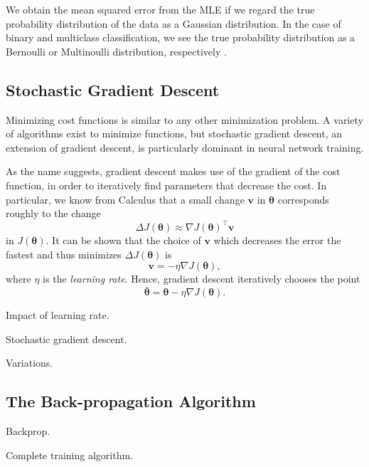 We obtain the mean squared error from the MLE if we regard the true probability distribution of the data as a Gaussian distribution. In the case of binary and multiclass classification, we see the true probability distribution as a Bernoulli or Multinoulli distribution, respectively \cite[ Ch.\,6,\,pp.\,175-185]{DBLP:books/daglib/0040158}.

\subsection{Stochastic Gradient Descent}
Minimizing cost functions is similar to any other minimization problem. A variety of algorithms exist to minimize functions, but stochastic gradient descent, an extension of gradient descent, is particularly dominant in neural network training.

As the name suggests, gradient descent makes use of the gradient of the cost function, in order to iteratively find parameters that decrease the cost. In particular, we know from Calculus that a small change $\bm{v}$ in $\bm{\theta}$ corresponds roughly to the change
\begin{equation}
\Delta J(\bm{\theta}) \approx \nabla J(\bm{\theta})^{\top}\bm{v}
\end{equation}
in $J(\bm{\theta})$. It can be shown that the choice of $\bm{v}$ which decreases the error the fastest and thus minimizes $\Delta J(\bm{\theta})$ is
\begin{equation}
\bm{v} = -\eta\nabla J(\bm{\theta}),
\end{equation}
where $\eta$ is the \emph{learning rate}. Hence, gradient descent iteratively chooses the point
\begin{equation}
\bar{\bm{\theta}} = \bm{\theta} - \eta\nabla J(\bm{\theta}).
\end{equation}

Impact of learning rate.

Stochastic gradient descent.

Variations.

\begin{comment}
Applying the Cauchy-Schwarz inequality, we obtain
\begin{equation}\label{eq:cauchy-schwarz}
-\lVert\nabla J(\bm{\theta})\rVert\lVert v\rVert \leq
\nabla J(\bm{\theta})^{\top}\bm{v} \leq
\lVert\nabla J(\bm{\theta})\rVert\lVert v\rVert.
\end{equation}
We observe that, if we set $\bm{v} = -\eta\nabla J(\bm{\theta})$, then
\begin{equation}
\nabla J(\bm{\theta})^{\top}\bm{v} = -\eta\lVert\nabla J(\bm{\theta})\rVert^2,
\end{equation}
which is exactly the left-hand side of Eq. \eqref{eq:cauchy-schwarz}. Thus, in order to minimize $\Delta J(\bm{\theta})$, we can choose new parameters $\bar{\bm{\theta}}$ with the update rule
\begin{equation}
\bar{\bm{\theta}} = \bm{\theta} - \eta\nabla J(\bm{\theta}),
\end{equation}
\end{comment}

\subsection{The Back-propagation Algorithm}
Backprop.

Complete training algorithm.
